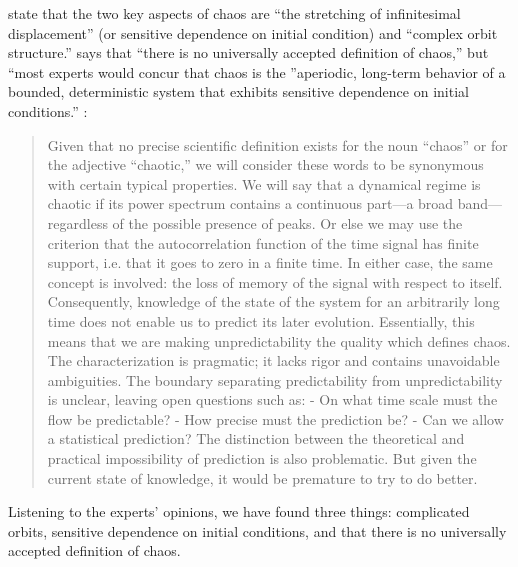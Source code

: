 \documentclass[10pt,twoside]{book}
\begin{document}
\citet[p.31]{abarbanel,ott1994} state that the two key aspects of chaos are  %
``the stretching of infinitesimal displacement'' (or sensitive dependence on initial condition) and ``complex orbit structure.''
\citet[p.104]{sprott} says that ``there is no universally accepted definition of chaos,'' but ``most experts would concur that chaos is the ''aperiodic, long-term behavior of a bounded, deterministic system that exhibits sensitive dependence on initial conditions.''
\citet[p.103]{berge}:
\begin{quotation}
  Given that no precise scientific definition exists for the noun ``chaos'' or for the adjective ``chaotic,'' we will consider these words to be synonymous with certain typical properties.
  We will say that a dynamical regime is chaotic if its power spectrum contains a continuous part---a broad band---regardless of the possible presence of peaks.
  Or else we may use the criterion that the autocorrelation function of the time signal has finite support, i.e. that it goes to zero in a finite time.
  In either case, the same concept is involved: the loss of memory of the signal with respect to itself.
  Consequently, knowledge of the state of the system for an arbitrarily long time does not enable us to predict its later evolution.
  Essentially, this means that we are making unpredictability the quality which defines chaos.
  The characterization is pragmatic; it lacks rigor and contains unavoidable ambiguities.
  The boundary separating predictability from unpredictability is unclear, leaving open questions such as:
  - On what time scale must the flow be predictable?
  - How precise must the prediction be?
  - Can we allow a statistical prediction?
  The distinction between the theoretical and practical impossibility of prediction is also problematic.
  But given the current state of knowledge, it would be premature to try to do better.
\end{quotation}
Listening to the experts' opinions, we have found three things: complicated orbits, sensitive dependence on initial conditions, and that there is no universally accepted definition of chaos.
\end{document}
